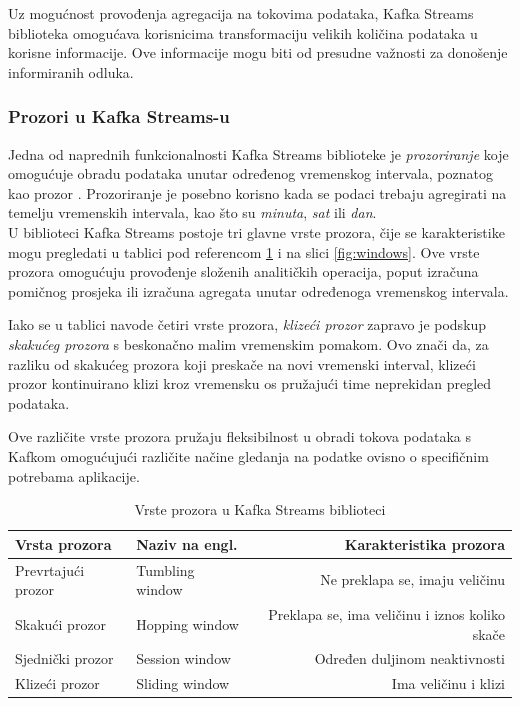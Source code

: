 \documentclass[times, utf8, diplomski]{fer}
\begin{document}
Uz mogućnost provođenja agregacija na tokovima podataka, Kafka Streams biblioteka omogućava korisnicima transformaciju velikih količina podataka u korisne informacije. Ove informacije mogu biti od presudne važnosti za donošenje informiranih odluka.

\subsubsection{Prozori u Kafka Streams-u}

Jedna od naprednih funkcionalnosti Kafka Streams biblioteke je \emph{prozoriranje}  koje omogućuje obradu podataka unutar određenog vremenskog intervala, poznatog kao prozor . Prozoriranje je posebno korisno kada se podaci trebaju agregirati na temelju vremenskih intervala, kao što su \emph{minuta}, \emph{sat} ili \emph{dan}.\\

U biblioteci Kafka Streams postoje tri glavne vrste prozora, čije se karakteristike mogu pregledati u tablici pod referencom \ref{tbl:windows} i na slici \ref{fig:windows}. Ove vrste prozora omogućuju provođenje složenih analitičkih operacija, poput izračuna pomičnog prosjeka ili izračuna agregata unutar određenoga vremenskog intervala.

Iako se u tablici navode četiri vrste prozora, \emph{klizeći prozor}  zapravo je podskup \emph{skakućeg prozora}  s beskonačno malim vremenskim pomakom. Ovo znači da, za razliku od skakućeg prozora koji \glqq preskače\grqq\hspace{1pt} na novi vremenski interval, klizeći prozor kontinuirano \glqq klizi\grqq\hspace{1pt}  kroz vremensku os pružajući time neprekidan pregled podataka.

Ove različite vrste prozora pružaju fleksibilnost u obradi tokova podataka s Kafkom omogućujući različite načine gledanja na podatke ovisno o specifičnim potrebama aplikacije.

\begin{table}[htb]
\caption{Vrste prozora u Kafka Streams biblioteci}
\label{tbl:windows}
\centering
\begin{tabular}{l|l|r} \toprule
Vrsta prozora & Naziv na engl. & Karakteristika prozora \\ \midrule
Prevrtajući prozor & Tumbling window & Ne preklapa se, imaju veličinu\\
Skakući prozor & Hopping window & Preklapa se, ima veličinu i iznos koliko skače\\
Sjednički prozor & Session window & Određen duljinom neaktivnosti\\
Klizeći prozor & Sliding window & Ima veličinu i klizi \\ \bottomrule
\end{tabular}
\end{table} 
\end{document}
